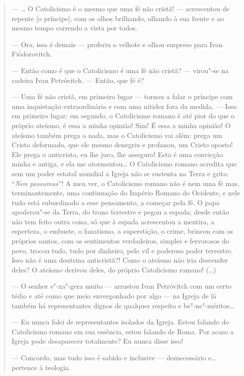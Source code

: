 \begin{quote}
--- \ldots{} O Catolicismo é o mesmo que uma fé não cristã! --- acrescentou de repente [o príncipe], com os olhos brilhando,
olhando à sua frente e ao mesmo tempo correndo a vista por todos.

--- Ora, isso é demais --- proferiu o velhote e olhou surpreso para Ivan Fiódorovitch.

--- Então como é que o Catolicismo é uma fé não cristã? --- virou"-se na cadeira Ivan Petróvitch. --- Então, que fé é?

--- Uma fé não cristã, em primeiro lugar --- tornou a falar o príncipe com uma inquietação extraordinária e com uma nitidez fora da medida. --- Isso em primeiro lugar; em segundo, o Catolicismo romano é até pior do que o próprio ateísmo, é essa a minha opinião! Sim! É essa a minha opinião! O ateísmo também prega o nada, mas o Catolicismo vai além: prega um Cristo deformado, que ele mesmo denegriu e profanou, um Cristo oposto! Ele prega o anticristo, eu lhe juro, lhe asseguro! Esta é uma convicção minha e antiga, e ela me atormentou\ldots{} O Catolicismo romano acredita que sem um poder estatal mundial a Igreja não se sustenta na
Terra e grita: ``\emph{Non possumus}''! A meu ver, o Catolicismo romano não é nem uma fé mas, terminantemente, uma continuação do Império Romano do Ocidente, e nele tudo está subordinado a esse pensamento, a começar pela fé. O papa apoderou"-se da Terra, do trono terrestre e pegou a espada; desde então não tem feito outra coisa, só que à espada acrescentou a mentira, a esperteza, o embuste, o fanatismo, a superstição, o crime, brincou com os próprios santos, com os sentimentos verdadeiros, simples
e fervorosos do povo, trocou tudo, tudo por dinheiro, pelo vil e poderoso poder terrestre. Isso não é uma doutrina anticristã?! Como o ateísmo não iria descender deles? O ateísmo derivou deles, do próprio Catolicismo romano! (\ldots{})

--- O senhor e"-xa"-gera muito --- arrastou Ivan Petróvitch com um certo tédio e até como que meio envergonhado por algo --- na Igreja de lá também há representantes dignos de qualquer respeito e be"-ne"-méritos\ldots{}

--- Eu nunca falei de representantes isolados da Igreja. Estou falando do Catolicismo romano em sua essência, estou falando de Roma. Por acaso a Igreja pode desaparecer totalmente? Eu nunca disse isso!

--- Concordo, mas tudo isso é sabido e inclusive --- desnecessário e\ldots{} pertence à teologia.


\end{quote}
